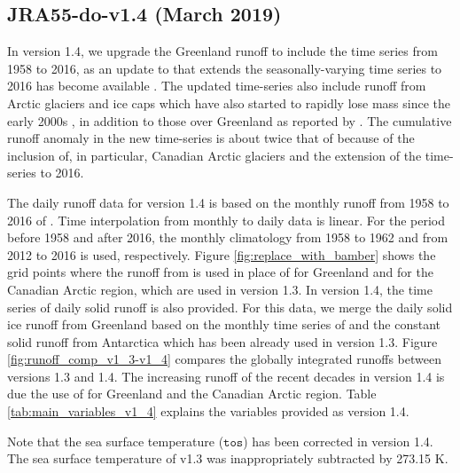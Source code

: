 \documentclass[dvipdfmx]{elsarticle_mod}
\begin{document}
\subsection{JRA55-do-v1.4 (March 2019)}

\label{app:version_1_4}

In version 1.4, we upgrade the Greenland runoff to include the time series from 1958 to 2016, as an update to \citet{Bamber_et_al_2012} that extends the seasonally-varying time series to 2016 has become available \citep{Bamber_et_al_2018}. The updated time-series also include runoff from Arctic glaciers and ice caps which have also started to rapidly lose mass since the early 2000s \citep[][]{Bamber_et_al_2018}, in addition to those over Greenland as reported by \citet{Bamber_et_al_2012}. The cumulative runoff anomaly in the new time-series is about twice that of \citet{Bamber_et_al_2012} because of the inclusion of, in particular, Canadian Arctic glaciers and the extension of the time-series to 2016. 

The daily runoff data for version 1.4 is based on the monthly runoff from 1958 to 2016 of \citet{Bamber_et_al_2018}. Time interpolation from monthly to daily data is linear. For the period before 1958 and after 2016, the monthly climatology from 1958 to 1962 and from 2012 to 2016 is used, respectively. Figure \ref{fig:replace_with_bamber} shows the grid points where the runoff from \citet{Bamber_et_al_2018} is used in place of \citet{Bamber_et_al_2012} for Greenland and \citet{Suzuki_et_al_2018} for the Canadian Arctic region, which are used in version 1.3. In version 1.4, the time series of daily solid runoff is also provided. For this data, we merge the daily solid ice runoff from Greenland based on the monthly time series of \citet{Bamber_et_al_2018} and the constant solid runoff from Antarctica \citep[][]{Depoorter_et_al_2013} which has been already used in version 1.3. Figure \ref{fig:runoff_comp_v1_3-v1_4} compares the globally integrated runoffs between versions 1.3 and 1.4. The increasing runoff of the recent decades in version 1.4 is due the use of \citet{Bamber_et_al_2018} for Greenland and the Canadian Arctic region. Table \ref{tab:main_variables_v1_4} explains the variables provided as version 1.4.

Note that the sea surface temperature ($\texttt{tos}$) has been corrected in version 1.4. The sea surface temperature of v1.3 was inappropriately subtracted by 273.15 \si{K}.
\end{document}

